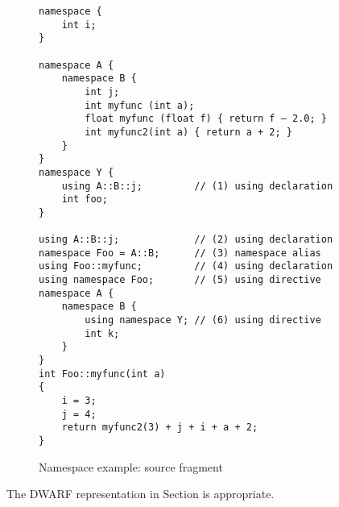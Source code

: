 \begin{figure}[here]
\begin{lstlisting}
namespace {
    int i;
}

namespace A {
    namespace B {
        int j;
        int myfunc (int a);
        float myfunc (float f) { return f – 2.0; }
        int myfunc2(int a) { return a + 2; }
    }
}
namespace Y {
    using A::B::j;         // (1) using declaration
    int foo;
}

using A::B::j;             // (2) using declaration
namespace Foo = A::B;      // (3) namespace alias
using Foo::myfunc;         // (4) using declaration
using namespace Foo;       // (5) using directive
namespace A {
    namespace B {
        using namespace Y; // (6) using directive
        int k;
    }
}
int Foo::myfunc(int a)
{
    i = 3;
    j = 4;
    return myfunc2(3) + j + i + a + 2;
}
\end{lstlisting}
\caption{Namespace example: source fragment} \label{fig:namespaceexamplesourcefragment}
\end{figure}


The DWARF representation in 
Section 
is appropriate.

